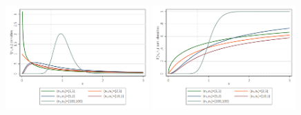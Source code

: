 \documentclass[a4paper,12pt]{article}
\begin{document}
\begin{figure}[H]
\begin{center}
{\includegraphics[width=0.49\textwidth]{figures/F_pdf}
\includegraphics[width=0.49\textwidth]{figures/F_cdf}}\label{f3}
\end{center}
\end{figure}
\end{document}
